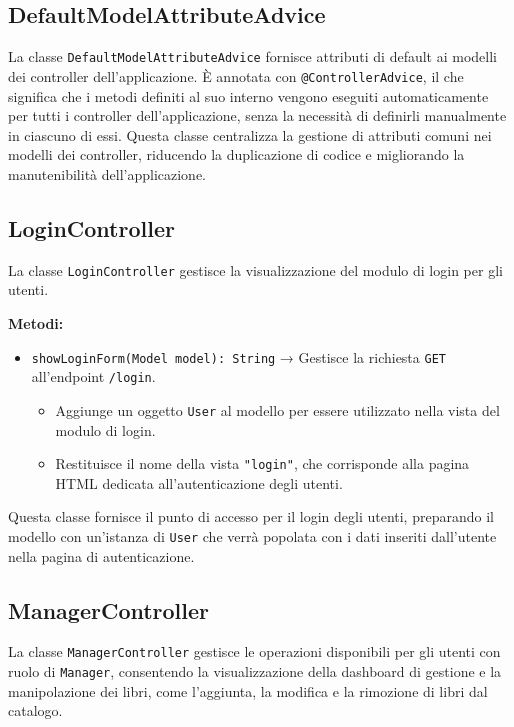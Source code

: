 \documentclass[twoside,openright,titlepage,fleqn,headinclude,12pt,a4paper,BCOR=5mm,footinclude]{scrbook}
\begin{document}
\subsection{DefaultModelAttributeAdvice}
La classe \texttt{DefaultModelAttributeAdvice} fornisce attributi di default ai modelli dei controller dell’applicazione. È annotata con \texttt{@ControllerAdvice}, il che significa che i metodi definiti al suo interno vengono eseguiti automaticamente per tutti i controller dell'applicazione, senza la necessità di definirli manualmente in ciascuno di essi.  
Questa classe centralizza la gestione di attributi comuni nei modelli dei controller, riducendo la duplicazione di codice e migliorando la manutenibilità dell’applicazione.

\subsection{LoginController}
La classe \texttt{LoginController} gestisce la visualizzazione del modulo di login per gli utenti.  

\textbf{Metodi:}  
\begin{itemize}  
    \item \texttt{showLoginForm(Model model): String} → Gestisce la richiesta \texttt{GET} all'endpoint \texttt{/login}.  
    \begin{itemize}  
        \item Aggiunge un oggetto \texttt{User} al modello per essere utilizzato nella vista del modulo di login.  
        \item Restituisce il nome della vista \texttt{"login"}, che corrisponde alla pagina HTML dedicata all'autenticazione degli utenti.  
    \end{itemize}  
\end{itemize}  

Questa classe fornisce il punto di accesso per il login degli utenti, preparando il modello con un'istanza di \texttt{User} che verrà popolata con i dati inseriti dall’utente nella pagina di autenticazione.


\subsection{ManagerController}
La classe \texttt{ManagerController} gestisce le operazioni disponibili per gli utenti con ruolo di \texttt{Manager}, consentendo la visualizzazione della dashboard di gestione e la manipolazione dei libri, come l'aggiunta, la modifica e la rimozione di libri dal catalogo.
\end{document}
